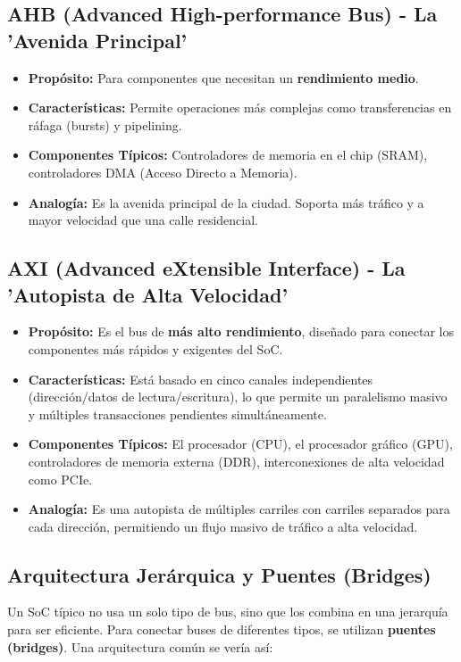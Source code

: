 \documentclass[12pt,a4paper]{article}
\begin{document}
\subsection{AHB (Advanced High-performance Bus) - La 'Avenida Principal'}
\begin{itemize}
    \item \textbf{Propósito:} Para componentes que necesitan un \textbf{rendimiento medio}.
    \item \textbf{Características:} Permite operaciones más complejas como transferencias en ráfaga (bursts) y pipelining.
    \item \textbf{Componentes Típicos:} Controladores de memoria en el chip (SRAM), controladores DMA (Acceso Directo a Memoria).
    \item \textbf{Analogía:} Es la avenida principal de la ciudad. Soporta más tráfico y a mayor velocidad que una calle residencial.
\end{itemize}

\subsection{AXI (Advanced eXtensible Interface) - La 'Autopista de Alta Velocidad'}
\begin{itemize}
    \item \textbf{Propósito:} Es el bus de \textbf{más alto rendimiento}, diseñado para conectar los componentes más rápidos y exigentes del SoC.
    \item \textbf{Características:} Está basado en cinco canales independientes (dirección/datos de lectura/escritura), lo que permite un paralelismo masivo y múltiples transacciones pendientes simultáneamente.
    \item \textbf{Componentes Típicos:} El procesador (CPU), el procesador gráfico (GPU), controladores de memoria externa (DDR), interconexiones de alta velocidad como PCIe.
    \item \textbf{Analogía:} Es una autopista de múltiples carriles con carriles separados para cada dirección, permitiendo un flujo masivo de tráfico a alta velocidad.
\end{itemize}

\subsection{Arquitectura Jerárquica y Puentes (Bridges)}

Un SoC típico no usa un solo tipo de bus, sino que los combina en una jerarquía para ser eficiente. Para conectar buses de diferentes tipos, se utilizan \textbf{puentes (bridges)}. Una arquitectura común se vería así:
\end{document}
